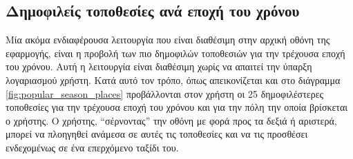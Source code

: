 \documentclass[oneside, 12pt]{book}
\begin{document}
\subsection{Δημοφιλείς τοποθεσίες ανά εποχή του χρόνου} \label{popular_places_by_season_section}
Μία ακόμα ενδιαφέρουσα λειτουργία που είναι διαθέσιμη στην αρχική 
οθόνη της εφαρμογής, είναι η προβολή των πιο δημοφιλών τοποθεσιών για 
την τρέχουσα εποχή του χρόνου. Αυτή η λειτουργία είναι διαθέσιμη χωρίς να απαιτεί την ύπαρξη λογαριασμού χρήστη.
Κατά αυτό τον τρόπο, όπως απεικονίζεται και στο διάγραμμα \ref{fig:popular_season_places} προβάλλονται στον χρήστη οι 25 δημοφιλέστερες τοποθεσίες για την τρέχουσα εποχή του χρόνου και για την πόλη την οποία βρίσκεται ο χρήστης. Ο χρήστης, ``σέρνοντας'' την οθόνη με φορά προς τα δεξιά ή αριστερά, μπορεί να πλοηγηθεί ανάμεσα σε αυτές τις τοποθεσίες και να τις προσθέσει ενδεχομένως σε ένα επερχόμενο ταξίδι του.
\end{document}
